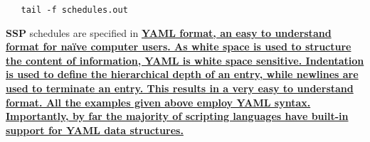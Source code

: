 \documentclass[12pt]{article}
\begin{document}
\begin{verbatim}
   tail -f schedules.out
\end{verbatim}
{\bf SSP} schedules are specified in \href{http://www.yaml.org/}\bf {YAML} format, an easy to understand format for na\"{i}ve computer users. As white space is  used to structure the content of information, YAML is white space sensitive. Indentation is used to define the hierarchical depth of an entry, while newlines are used to terminate an entry. This results in a very easy to understand format. All the examples given above employ YAML syntax. Importantly, by far the majority of scripting languages have built-in support for YAML data structures. 
\end{document}
